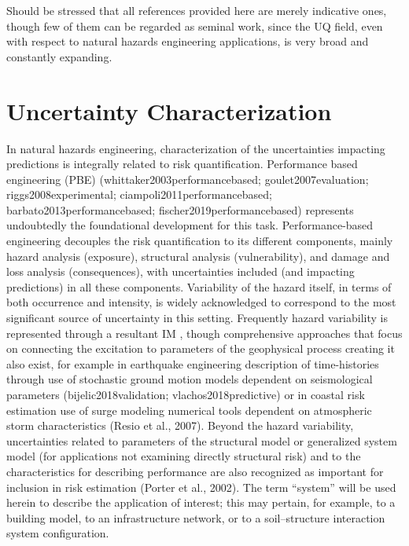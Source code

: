 Should be stressed that all references provided here are merely indicative ones, though few of them can be regarded as seminal work, since the UQ field, even with respect to natural hazards engineering applications, is very broad and constantly expanding.    

\section{Uncertainty Characterization}
\label{sec:uq_characterization}

In natural hazards engineering, characterization of the uncertainties impacting predictions is integrally related to risk quantification. Performance based engineering (PBE) (whittaker2003performancebased; goulet2007evaluation; riggs2008experimental; ciampoli2011performancebased; barbato2013performancebased; fischer2019performancebased) represents undoubtedly the foundational development for this task. Performance-based engineering decouples the risk quantification to its different components, mainly hazard analysis (exposure), structural analysis (vulnerability), and damage and loss analysis (consequences), with uncertainties included (and impacting predictions) in all these components. Variability of the hazard itself, in terms of both occurrence and intensity, is widely acknowledged to correspond to the most significant source of uncertainty in this setting. Frequently hazard variability is represented through a resultant IM \citep{baker2005vectorvalued,kohrangi2016implications}, though comprehensive approaches that focus on connecting the excitation to parameters of the geophysical process creating it also exist, for example in earthquake engineering description of time-histories through use of stochastic ground motion models dependent on seismological parameters (bijelic2018validation; vlachos2018predictive) or in coastal risk estimation use of surge modeling numerical tools dependent on atmospheric storm characteristics (Resio et al., 2007). Beyond the hazard variability, uncertainties related to parameters of the structural model or generalized system model (for applications not examining directly structural risk) and to the characteristics for describing performance are also recognized as important for inclusion in risk estimation (Porter et al., 2002). The term “system” will be used herein to describe the application of interest; this may pertain, for example, to a building model, to an infrastructure network, or to a soil–structure interaction system configuration. 

